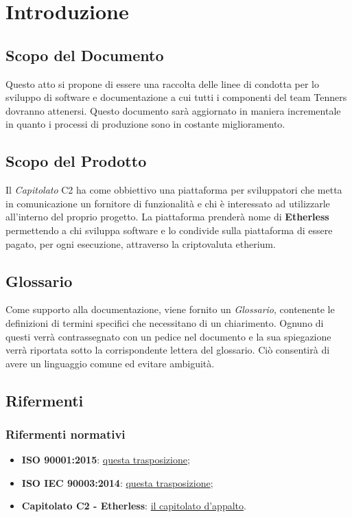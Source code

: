 \section{Introduzione}

\subsection{Scopo del Documento}
Questo atto si propone di essere una raccolta delle linee di condotta per lo
sviluppo di software e documentazione a cui tutti i componenti del team Tenners
dovranno attenersi.
Questo documento sar\`a aggiornato in maniera incrementale in quanto i processi
di produzione sono in costante miglioramento.

\subsection{Scopo del Prodotto}
Il \textit{Capitolato\glo} C2 ha come obbiettivo una piattaforma per sviluppatori che metta
in comunicazione un fornitore di funzionalit\`a e chi \`e interessato ad utilizzarle
all'interno del proprio progetto.
La piattaforma prender\`a nome di \textbf{Etherless} permettendo a chi sviluppa software e
lo condivide sulla piattaforma di essere pagato, per ogni esecuzione, attraverso
la criptovaluta etherium.


\subsection{Glossario}
Come supporto alla documentazione, viene fornito un \textit{Glossario}\docs,
contenente le definizioni di termini specifici che necessitano di un chiarimento.
Ognuno di questi verr\`a contrassegnato con un pedice \glo nel documento e la sua
spiegazione verr\`a riportata sotto la corrispondente lettera del glossario. Ci\`o
consentir\`a di avere un linguaggio comune ed evitare ambiguit\`a.

\subsection{Rifermenti}
\subsubsection{Rifermenti normativi}
\begin{itemize}
  \item \textbf{ISO 90001:2015}: \href{https://www.praxiom.com/iso-9001.htm}{questa trasposizione};
  \item \textbf{ISO IEC 90003:2014}: \href{https://www.praxiom.com/iso-90003.htm}{questa trasposizione};
  \item \textbf{Capitolato C2 - Etherless}: \href{https://www.math.unipd.it/~tullio/IS-1/2019/Progetto/C2.pdf}{il capitolato d'appalto}.
\end{itemize}

